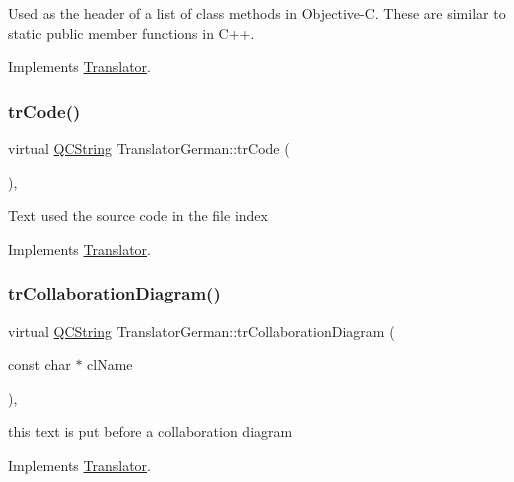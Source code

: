 Used as the header of a list of class methods in Objective-\/C. These are similar to static public member functions in C++. 

Implements \mbox{\hyperlink{class_translator}{Translator}}.

\mbox{\label{class_translator_german_acca9e04a7aeff7ce36eb00538f1a9e7e}} 
\subsubsection{\texorpdfstring{trCode()}{trCode()}}
{\footnotesize\ttfamily virtual \mbox{\hyperlink{class_q_c_string}{Q\+C\+String}} Translator\+German\+::tr\+Code (\begin{DoxyParamCaption}{ }\end{DoxyParamCaption})\hspace{0.3cm}{\ttfamily [inline]}, {\ttfamily [virtual]}}

Text used the source code in the file index 

Implements \mbox{\hyperlink{class_translator}{Translator}}.

\mbox{\label{class_translator_german_ae156647835639f6f2d2efa369807fe79}} 
\subsubsection{\texorpdfstring{trCollaborationDiagram()}{trCollaborationDiagram()}}
{\footnotesize\ttfamily virtual \mbox{\hyperlink{class_q_c_string}{Q\+C\+String}} Translator\+German\+::tr\+Collaboration\+Diagram (\begin{DoxyParamCaption}\item[{const char $\ast$}]{cl\+Name }\end{DoxyParamCaption})\hspace{0.3cm}{\ttfamily [inline]}, {\ttfamily [virtual]}}

this text is put before a collaboration diagram 

Implements \mbox{\hyperlink{class_translator}{Translator}}.

\mbox{\label{class_translator_german_a1865dd991dc628b6b063ef3c2f301698}} 
